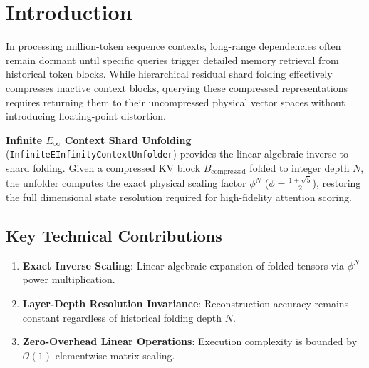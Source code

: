 \section{Introduction}
In processing million-token sequence contexts, long-range dependencies often remain dormant until specific queries trigger detailed memory retrieval from historical token blocks. While hierarchical residual shard folding effectively compresses inactive context blocks, querying these compressed representations requires returning them to their uncompressed physical vector spaces without introducing floating-point distortion.

\textbf{Infinite $E_\infty$ Context Shard Unfolding} (\texttt{InfiniteEInfinityContextUnfolder}) provides the linear algebraic inverse to shard folding. Given a compressed KV block $B_{\text{compressed}}$ folded to integer depth $N$, the unfolder computes the exact physical scaling factor $\phi^N$ ($\phi = \frac{1+\sqrt{5}}{2}$), restoring the full dimensional state resolution required for high-fidelity attention scoring.

\subsection{Key Technical Contributions}
\begin{enumerate}[label=\textbf{\arabic*.}]
    \item \textbf{Exact Inverse Scaling}: Linear algebraic expansion of folded tensors via $\phi^N$ power multiplication.
    \item \textbf{Layer-Depth Resolution Invariance}: Reconstruction accuracy remains constant regardless of historical folding depth $N$.
    \item \textbf{Zero-Overhead Linear Operations}: Execution complexity is bounded by $\mathcal{O}(1)$ elementwise matrix scaling.
\end{enumerate}
